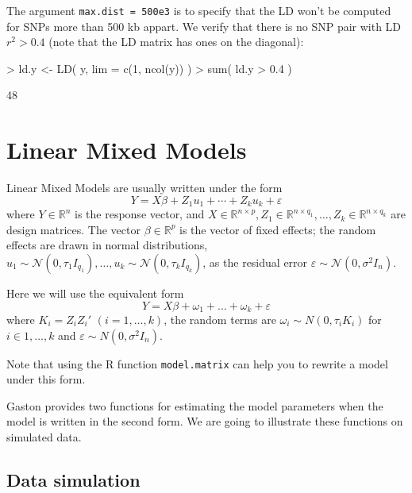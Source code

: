 \documentclass{article}
\let\epsilon\varepsilon
\renewenvironment{Schunk}{\vspace{\topsep}}{\vspace{\topsep}}
\begin{document}
The argument \verb!max.dist = 500e3! is to specify that the LD won't be computed for
SNPs more than 500 kb appart. We verify that there is no SNP pair with LD $r^2 > 0.4$
(note that the LD matrix has ones on the diagonal):

\begin{Schunk}
\begin{Sinput}
> ld.y <- LD( y, lim = c(1, ncol(y)) )
> sum( ld.y > 0.4 )
\end{Sinput}
\begin{Soutput}
[1] 48
\end{Soutput}
\end{Schunk}

\vfill\eject
\section{Linear Mixed Models}

\def\R{\mathbb{R}}
\def\N{\mathcal{N}}

  Linear Mixed Models are usually written under the form
  \begin{equation*}
    Y = X\beta + Z_1 u_1 + \cdots + Z_k u_k + \varepsilon
  \end{equation*}
  where $Y \in\R^{n}$ is the response vector, and $X\in \R^{n\times p}, Z_1 \in \R^{n\times q_1}, \dots, Z_k \in\R^{n\times q_k}$ are
  design matrices. The vector $\beta\in\R^p$ is the vector of fixed effects; the random effects are drawn in 
  normal distributions, $u_1\sim \N(0, \tau_1 I_{q_1}), \dots, u_k\sim \N(0, \tau_k I_{q_k})$, as the residual
  error $\epsilon\sim\N(0,\sigma^2 I_n)$.

  Here we will use the equivalent form 
  \begin{equation*}
    Y = X\beta + \omega_1 + \ldots + \omega_k + \varepsilon
  \end{equation*}
  where $K_i = Z_i Z_i'$ $(i = 1, \dots, k)$,
  the random terms are $\omega_i \sim N(0,\tau_i K_i)$ for $i \in 1, \dots,k$ and $\varepsilon \sim N(0,\sigma^2 I_n)$.

  Note that using the R function \verb!model.matrix! can help you to rewrite a model under this form.

  Gaston provides two functions for estimating the model parameters when the model is
  written in the second form. We are going to illustrate these functions on simulated
  data.

  \subsection{Data simulation}
\end{document}

